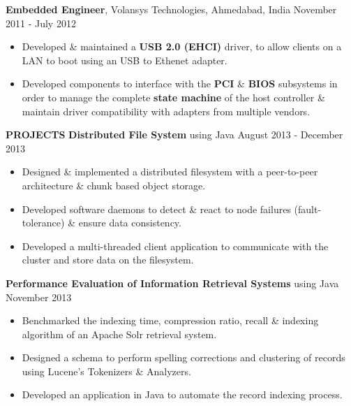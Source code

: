 \documentclass[10pt, letterpaper]{article}
\begin{document}
\textbf{Embedded Engineer}, Volansys Technologies, Ahmedabad, India \hfill November 2011 - July 2012
\begin{itemize}
    \item Developed \& maintained a \textbf{USB 2.0 (EHCI)} driver, to allow 
clients on a LAN to boot using an USB to Ethenet adapter.
    \item Developed components to interface with the \textbf{PCI} \& \textbf{BIOS} 
subsystems in order to manage the complete \textbf{state machine} of the host controller
\& maintain driver compatibility with adapters from multiple vendors. 
\end{itemize}

\textbf{PROJECTS}
\smallskip 
\newline
\textbf{Distributed File System} using Java \hfill August 2013 - December 2013
\begin{itemize}
    \item Designed \& implemented a distributed filesystem with a peer-to-peer 
architecture \& chunk based object storage.
    \item Developed software daemons to detect \& react to node failures (fault-tolerance) \& ensure data consistency.  
    \item Developed a multi-threaded client application to communicate with the cluster and store data on the filesystem.
\end{itemize}

\textbf{Performance Evaluation of Information Retrieval Systems} using Java \hfill November 2013
\begin{itemize}
    \item Benchmarked the indexing time, compression ratio, recall \& indexing 
algorithm of an Apache Solr retrieval system.
    \item Designed a schema to perform spelling corrections and clustering of 
records using Lucene's Tokenizers \& Analyzers.
    \item Developed an application in Java to automate the record indexing process.
\end{itemize}
\end{document}
